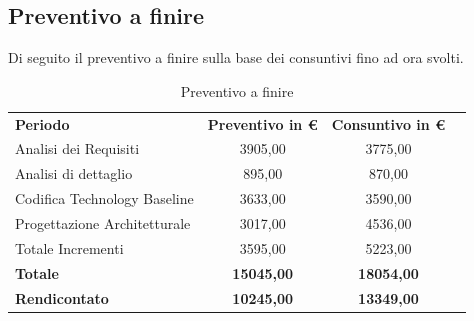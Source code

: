 \newpage


\subsection{Preventivo a finire}
Di seguito il preventivo a finire sulla base dei consuntivi fino ad ora svolti.
\begin{table} [h!]
	\begin{center}
		\begin{tabular} { m{8 cm} c c c  }
			\rowcolor{lightgray}
			\textbf{Periodo}  & \textbf{Preventivo in \euro} & \textbf{Consuntivo in \euro} \\
			Analisi dei Requisiti   			& 3905,00     & 3775,00 \\
			Analisi di dettaglio  				& 895,00     & 870,00 \\
			Codifica Technology Baseline        & 3633,00     & 3590,00 \\
			Progettazione Architetturale		&3017,00		&  4536,00\\
			Totale Incrementi				& 3595,00		&	5223,00\\
			\textbf{Totale}     & \textbf{15045,00}         & \textbf{18054,00}   \\
			\textbf{Rendicontato}  & \textbf{10245,00}          & \textbf{13349,00}   \\
			
			
		\end{tabular}
		\caption{Preventivo a finire }
	\end{center}
\end{table}
 \\
